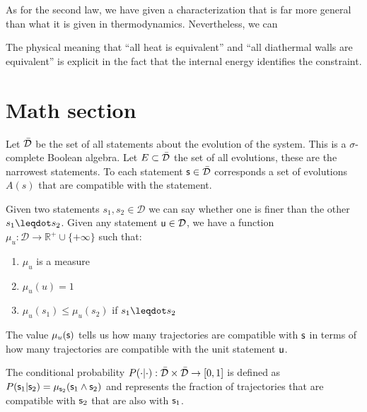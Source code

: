\documentclass[letterpaper]{article}
\begin{document}
As for the second law, we have given a characterization that is far more general than what it is given in thermodynamics. Nevertheless, we can 


 The physical meaning that ``all heat is equivalent'' and ``all diathermal walls are equivalent'' is explicit in the fact that the internal energy identifies the constraint.

\section{Math section}

Let $\tdomain$ be the set of all statements about the evolution of the system. This is a $\sigma$-complete Boolean algebra. Let $E \subset \tdomain$ the set of all evolutions, these are the narrowest statements. To each statement $\stmt \in \tdomain$ corresponds a set of evolutions $A(s)$ that are compatible with the statement.

Given two statements $s_1, s_2 \in \mathcal{D}$ we can say whether one is finer than the other $s_1 \finer s_2$. Given any statement $\stmt[u] \in \mathcal{D}$, we have a function $\mu_u : \mathcal{D} \to \mathbb{R}^+\cup \{+\infty \}$ such that:
\begin{enumerate}
	\item $\mu_u$ is a measure
	\item $\mu_u(u) = 1$
	\item $\mu_u(s_1) \leq \mu_u(s_2)$ if $s_1 \finer s_2$
\end{enumerate}
The value $\mu_u(\stmt)$ tells us how many trajectories are compatible with $\stmt$ in terms of how many trajectories are compatible with the unit statement $\stmt[u]$.

The conditional probability $P(\cdot | \cdot) : \tdomain \times \tdomain \to [0,1]$ is defined as $P(\stmt_1 | \stmt_2) = \mu_{\stmt_2}(\stmt_1 \AND \stmt_2)$ and represents the fraction of trajectories that are compatible with $\stmt_2$ that are also with $\stmt_1$.
\end{document}
